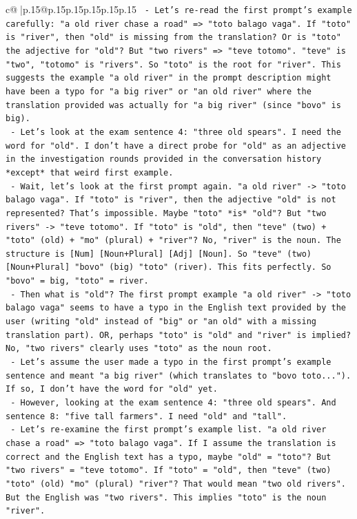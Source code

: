 \documentclass{article}
\begin{document}
{\begin{supertabular}{c@{$\;$}|p{.15\linewidth}@{}p{.15\linewidth}p{.15\linewidth}p{.15\linewidth}p{.15\linewidth}p{.15\linewidth}}
{{{\texttt{   {-} Let's re{-}read the first prompt's example carefully: "a old river chase a road" => "toto balago vaga". If "toto" is "river", then "old" is missing from the translation? Or is "toto" the adjective for "old"? But "two rivers" => "teve totomo". "teve" is "two", "totomo" is "rivers". So "toto" is the root for "river". This suggests the example "a old river" in the prompt description might have been a typo for "a big river" or "an old river" where the translation provided was actually for "a big river" (since "bovo" is big).} \\
\texttt{   {-} Let's look at the exam sentence 4: "three old spears". I need the word for "old". I don't have a direct probe for "old" as an adjective in the investigation rounds provided in the conversation history *except* that weird first example.} \\
\texttt{   {-} Wait, let's look at the first prompt again. "a old river" {-}> "toto balago vaga". If "toto" is "river", then the adjective "old" is not represented? That's impossible. Maybe "toto" *is* "old"? But "two rivers" {-}> "teve totomo". If "toto" is "old", then "teve" (two) + "toto" (old) + "mo" (plural) + "river"? No, "river" is the noun. The structure is {[}Num{]} {[}Noun+Plural{]} {[}Adj{]} {[}Noun{]}. So "teve" (two) {[}Noun+Plural{]} "bovo" (big) "toto" (river). This fits perfectly. So "bovo" = big, "toto" = river.} \\
\texttt{   {-} Then what is "old"? The first prompt example "a old river" {-}> "toto balago vaga" seems to have a typo in the English text provided by the user (writing "old" instead of "big" or "an old" with a missing translation part). OR, perhaps "toto" is "old" and "river" is implied? No, "two rivers" clearly uses "toto" as the noun root.} \\
\texttt{   {-} Let's assume the user made a typo in the first prompt's example sentence and meant "a big river" (which translates to "bovo toto..."). If so, I don't have the word for "old" yet.} \\
\texttt{   {-} However, looking at the exam sentence 4: "three old spears". And sentence 8: "five tall farmers". I need "old" and "tall".} \\
\texttt{   {-} Let's re{-}examine the first prompt's example list. "a old river chase a road" => "toto balago vaga". If I assume the translation is correct and the English text has a typo, maybe "old" = "toto"? But "two rivers" = "teve totomo". If "toto" = "old", then "teve" (two) "toto" (old) "mo" (plural) "river"? That would mean "two old rivers". But the English was "two rivers". This implies "toto" is the noun "river".} \\
}}}
\end{supertabular}}
\end{document}
